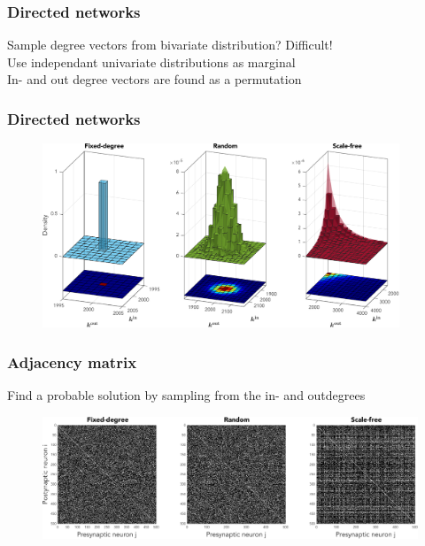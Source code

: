 \begin{frame}
\frametitle{Directed networks} 
Sample degree vectors from bivariate distribution? Difficult!\\
\tabitem Use independant univariate distributions as marginal \\
\tabitem In- and out degree vectors are found as a permutation
\end{frame}

\begin{frame}
\frametitle{Directed networks} 
\begin{figure}[ht]
\centering
\includegraphics[width = 0.95\textwidth]{../Figures/Distributions/2D.pdf}
\label{fig:2Ddistributions}
\end{figure}
\end{frame}

\begin{frame}
\frametitle{Adjacency matrix} 
Find a probable solution by sampling from the in- and outdegrees
\begin{figure}[H]
\centering
\includegraphics[width = \textwidth]{../Figures/Adjacency_matrices.pdf}
\label{fig:adjacencymatrices}
\end{figure}
\end{frame}

